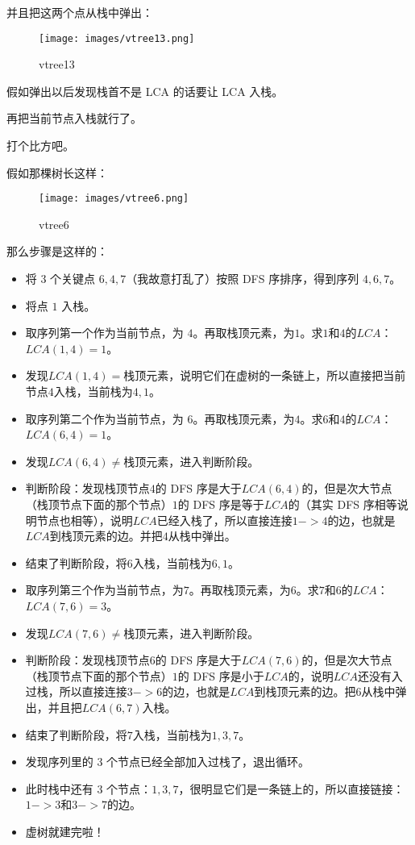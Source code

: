 {并且把这两个点从栈中弹出：

\begin{figure}[h]
\centering
\texttt{[image: images/vtree13.png]} 
\caption{vtree13}
\end{figure}

假如弹出以后发现栈首不是 LCA 的话要让 LCA 入栈。

再把当前节点入栈就行了。

打个比方吧。

假如那棵树长这样：

\begin{figure}[h]
\centering
\texttt{[image: images/vtree6.png]} 
\caption{vtree6}
\end{figure}

那么步骤是这样的：

\begin{itemize}
\item 将 3 个关键点 $6,4,7$（我故意打乱了）按照 DFS 序排序，得到序列 $4,6,7$。
\item 将点 $1$ 入栈。
\item 取序列第一个作为当前节点，为 $4$。再取栈顶元素，为$1$。求$1$和$4$的$LCA$：$LCA(1,4)=1$。
\item 发现$LCA(1,4)=$栈顶元素，说明它们在虚树的一条链上，所以直接把当前节点$4$入栈，当前栈为$4,1$。
\item 取序列第二个作为当前节点，为 $6$。再取栈顶元素，为$4$。求$6$和$4$的$LCA$：$LCA(6,4)=1$。
\item 发现$LCA(6,4)\neq$栈顶元素，进入判断阶段。
\item 判断阶段：发现栈顶节点$4$的 DFS 序是大于$LCA(6,4)$的，但是次大节点（栈顶节点下面的那个节点）$1$的 DFS 序是等于$LCA$的（其实 DFS 序相等说明节点也相等），说明$LCA$已经入栈了，所以直接连接$1->4$的边，也就是$LCA$到栈顶元素的边。并把$4$从栈中弹出。
\item 结束了判断阶段，将$6$入栈，当前栈为$6,1$。
\item 取序列第三个作为当前节点，为$7$。再取栈顶元素，为$6$。求$7$和$6$的$LCA$：$LCA(7,6)=3$。
\item 发现$LCA(7,6)\neq$栈顶元素，进入判断阶段。
\item 判断阶段：发现栈顶节点$6$的 DFS 序是大于$LCA(7,6)$的，但是次大节点（栈顶节点下面的那个节点）$1$的 DFS 序是小于$LCA$的，说明$LCA$还没有入过栈，所以直接连接$3->6$的边，也就是$LCA$到栈顶元素的边。把$6$从栈中弹出，并且把$LCA(6,7)$入栈。
\item 结束了判断阶段，将$7$入栈，当前栈为$1,3,7$。
\item 发现序列里的 3 个节点已经全部加入过栈了，退出循环。
\item 此时栈中还有 3 个节点：$1, 3,7$，很明显它们是一条链上的，所以直接链接：$1->3$和$3->7$的边。
\item 虚树就建完啦！
\end{itemize}

}
